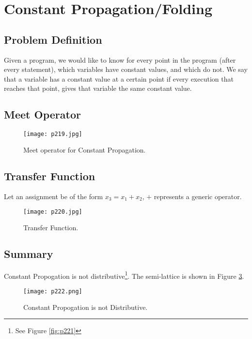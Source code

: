 \newpage

\section{Constant Propagation/Folding\cite{Microsof98:online}}


\subsection{Problem Definition }


Given a program, we would like to know for every point in the program (after every
statement), which variables have constant values, and which do not. We say that a
variable has a constant value at a certain point if every execution that reaches that point,
gives that variable the same constant value.


\subsection{Meet Operator}

\begin{figure}[H]
	\centering
	\texttt{[image: p219.jpg]}
	\caption{Meet operator for Constant Propagation.}
	\label{fig:p219}
\end{figure}


\subsection{Transfer Function}


Let an assignment be of the form $x_3 = x_1 + x_2$, $+$ represents a generic operator.


\begin{figure}[H]
	\centering
	\texttt{[image: p220.jpg]}
	\caption{Transfer Function.}
	\label{fig:p220}
\end{figure}

\subsection{Summary}
Constant Propogation is not distributive\footnote{See Figure \ref{fig:p221}}.
The semi-lattice is shown in Figure \ref{fig:p222}.



\begin{figure}[H]
	\centering
	\texttt{[image: p222.png]}
	\caption{Constant Propogation is not Distributive.}
	\label{fig:p222}
\end{figure}


